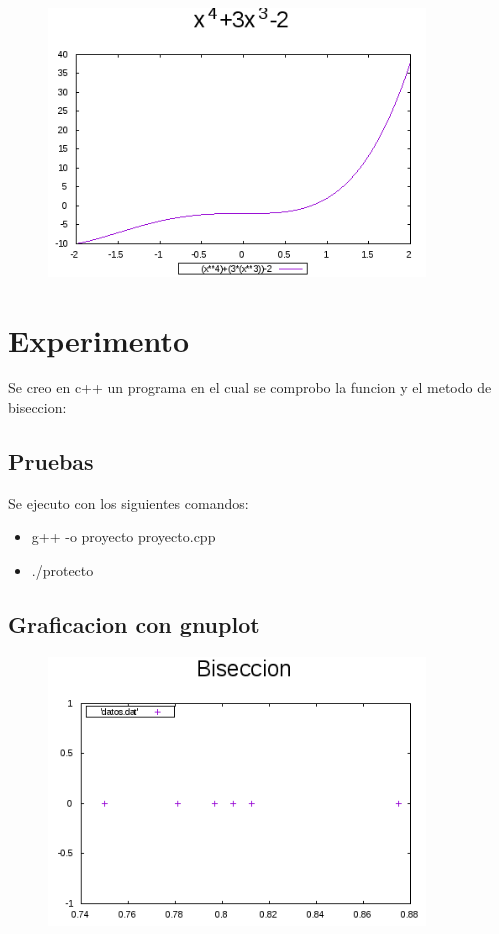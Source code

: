 \documentclass[11pt]{article}
\begin{document}
\clearpage

\begin{figure}[htp]
\centering
\includegraphics[width=10cm]{caso.png}
\label{fig:lion}
\end{figure}


\section{Experimento}

Se creo en c++ un programa en el cual se comprobo la funcion y  el metodo de biseccion:


\clearpage
\subsection{Pruebas}
Se ejecuto con los siguientes comandos:
\begin{itemize}
\item g++ -o proyecto proyecto.cpp
\item ./protecto
\end{itemize}

\subsection{Graficacion con gnuplot}

\begin{figure}[htp]
\centering
\includegraphics[width=10cm]{comparacion.png}
\label{fig:lion}
\end{figure}
\end{document}
